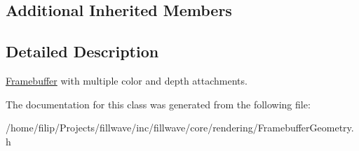 \subsection*{Additional Inherited Members}


\subsection{Detailed Description}
\hyperlink{classfillwave_1_1core_1_1Framebuffer}{Framebuffer} with multiple color and depth attachments. 

The documentation for this class was generated from the following file\+:\begin{DoxyCompactItemize}
\item 
/home/filip/\+Projects/fillwave/inc/fillwave/core/rendering/Framebuffer\+Geometry.\+h\end{DoxyCompactItemize}
